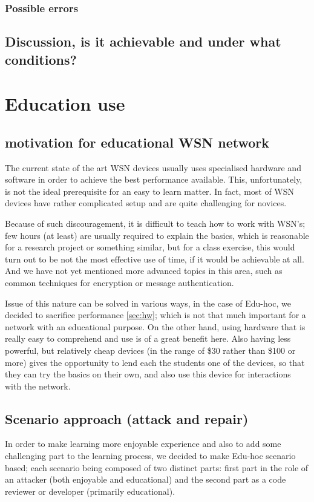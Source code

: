 \documentclass[
  digital, %
  table,   %
  nolof,     %
  nolot,     %
           oneside
]{fithesis3}
\begin{document}
    \subsection{Possible errors}
  \section{Discussion, is it achievable and under what conditions?}

\chapter{Education use}\label{ch:edu}

  \section{motivation for educational WSN network}
  The current state of the art WSN devices usually uses specialised hardware
  and software in order to achieve the best performance available. %
  This, unfortunately, is not the ideal prerequisite for an easy to learn matter. In fact, most of WSN devices have rather complicated setup and are
  quite challenging for novices. %

  Because of such discouragement, it is difficult to teach how to
  work with WSN’s; few hours (at least) are usually required
  to explain the basics, which is reasonable for a research project or
  something similar, but for a class exercise, this would turn out to be
  not the most effective use of time, if it would be achievable at all. And
  we have not yet mentioned more advanced topics in this area, such as
  common techniques for encryption or message authentication.

  Issue of this nature can be solved in various ways,
  in the case of Edu-hoc, we decided to sacrifice performance \ref{sec:hw}; which is not that much important for a network with an educational purpose. On the other hand, using hardware that is really easy to comprehend and use is of a great benefit here. Also having less powerful, but relatively cheap devices (in the range of \$30 rather than \$100 or more) gives the opportunity to lend each the students one of the devices, so that they can try the basics on their own, and also use this device for interactions with the network.

  \section{Scenario approach (attack and repair)}
  In order to make learning more enjoyable experience and also to add some challenging part to the learning process, we decided to make Edu-hoc scenario based; each scenario being composed of two distinct parts: first part in the role of an attacker (both enjoyable and educational) and the second part as a code reviewer or developer (primarily educational).
\end{document}
